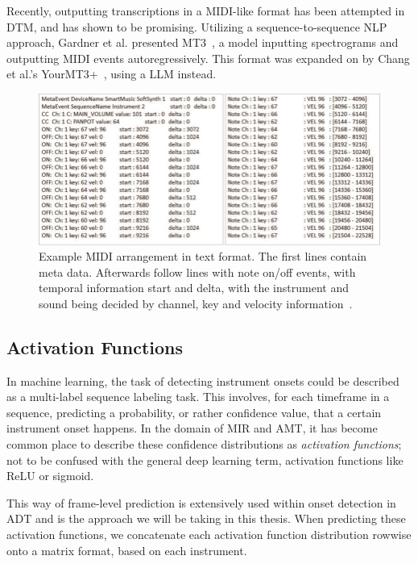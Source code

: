 Recently, outputting transcriptions in a \gls{MIDI}-like format has been attempted in \gls{DTM}, and has shown to be promising. Utilizing a sequence-to-sequence \gls{NLP} approach, Gardner et al. presented MT3~\cite{gardner2022mt3multitaskmultitrackmusic}, a model inputting spectrograms and outputting \gls{MIDI} events autoregressively. This format was expanded on by Chang et al.'s YourMT3+~\cite{chang2024yourmt3+}, using a \gls{LLM} instead.

\begin{figure}[H]
    \centering
    \includegraphics[scale=0.65, trim={0 0 13.8cm 0},clip]{figures/midi}
    \caption{Example MIDI arrangement in text format. The first lines contain meta data. Afterwards follow lines with note on/off events, with temporal information start and delta, with the instrument and sound being decided by channel, key and velocity information~\cite{starostenko2019}.}
    \label{MIDIFigure}
\end{figure}

\subsection{Activation Functions}

In machine learning, the task of detecting instrument onsets could be described as a multi-label sequence labeling task. This involves, for each timeframe in a sequence, predicting a probability, or rather confidence value, that a certain instrument onset happens. In the domain of \gls{MIR} and \gls{AMT}, it has become common place to describe these confidence distributions as \textit{activation functions}; not to be confused with the general deep learning term, activation functions like ReLU or sigmoid.~\cite{8350302, Southall2016AutomaticDT, vogl2018multiinstrumentdrumtranscription}

This way of frame-level prediction is extensively used within onset detection in \gls{ADT} and is the approach we will be taking in this thesis. When predicting these activation functions, we concatenate each activation function distribution rowwise onto a matrix format, based on each instrument.

